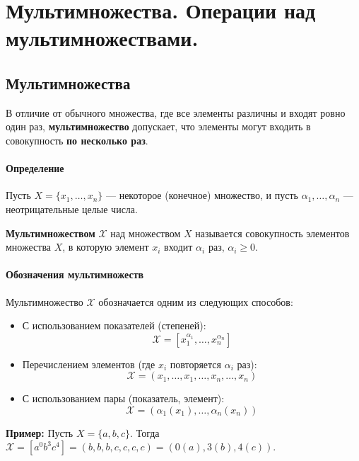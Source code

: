 \section{Мультимножества. Операции над мультимножествами.}

\subsection*{Мультимножества}

В отличие от обычного множества, где все элементы различны и входят ровно один раз, \textbf{мультимножество} допускает, что элементы могут входить в совокупность \textbf{по несколько раз}.

\paragraph{Определение}
Пусть $X = \{x_1, \ldots, x_n\}$ --- некоторое (конечное) множество, и пусть $\alpha_1, \ldots, \alpha_n$ --- неотрицательные целые числа.

\textbf{Мультимножеством} $\mathcal{X}$ над множеством $X$ называется совокупность элементов множества $X$, в которую элемент $x_i$ входит $\alpha_i$ раз, $\alpha_i \ge 0$.

\paragraph{Обозначения мультимножеств}
Мультимножество $\mathcal{X}$ обозначается одним из следующих способов:
\begin{itemize}
    \item С использованием показателей (степеней):
    $$\mathcal{X} = [x_1^{\alpha_1}, \ldots, x_n^{\alpha_n}]$$
    \item Перечислением элементов (где $x_i$ повторяется $\alpha_i$ раз):
    $$\mathcal{X} = (x_1, \ldots, x_1, \ldots, x_n, \ldots, x_n)$$
    \item С использованием пары (показатель, элемент):
    $$\mathcal{X} = (\alpha_1(x_1), \ldots, \alpha_n(x_n))$$
\end{itemize}

\textbf{Пример:} Пусть $X = \{a, b, c\}$. Тогда $\mathcal{X} = [a^0 b^3 c^4] = (b, b, b, c, c, c, c) = (0(a), 3(b), 4(c))$.

